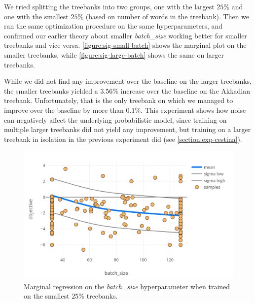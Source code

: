 We tried splitting the treebanks into two groups, one with the largest $25\%$
and one with the smallest $25\%$ (based on number of words in the treebank).
Then we ran the same optimization procedure on the same hyperparameters, and
confirmed our earlier theory about smaller \emph{batch\_size} working better
for smaller treebanks and vice versa. \autoref{figure:sig-small-batch} shows
the marginal plot on the smaller treebanks, while
\autoref{figure:sig-large-batch} shows the same on larger treebanks.

While we did not find any improvement over the baseline on the larger
treebanks, the smaller treebanks yielded a $3.56\%$ increase over the baseline
on the Akkadian treebank. Unfortunately, that is the only treebank on which we
managed to improve over the baseline by more than $0.1\%$. This experiment
shows how noise can negatively affect the underlying probabilistic model, since
training on multiple larger treebanks did not yield any improvement, but
training on a larger treebank in isolation in the previous experiment did (see
\autoref{section:exp-cestina}).

\begin{figure}
	\begin{center}
		\includegraphics[width=1.0\textwidth]{images/sig-small-batch.png}
		\caption{Marginal regression on the \emph{batch\_size} hyperparameter when trained on the smallest $25\%$ treebanks.}
		\label{figure:sig-small-batch}
	\end{center}
\end{figure}


